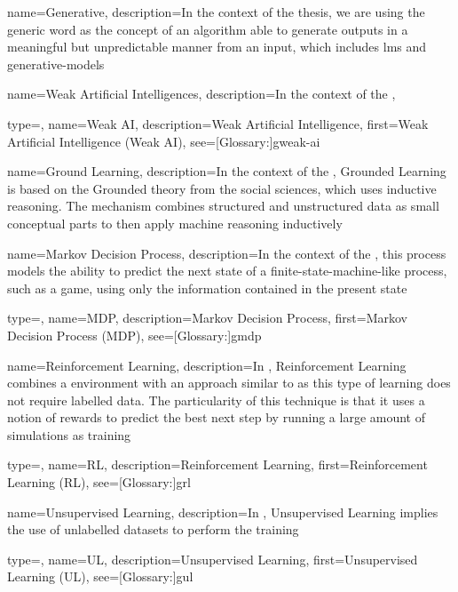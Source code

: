 {
  name={Generative},
  description={In the context of the thesis, we are using the generic word  as the concept of an algorithm able to generate outputs in a meaningful but unpredictable manner from an input, which includes \glspl{lm} and \glspl{generative-model}}
}

{
  name={Weak Artificial Intelligences},
  description={In the context of the , }
}

{
  type=\acronymtype,
  name={Weak AI},
  description={Weak Artificial Intelligence},
  first={Weak Artificial Intelligence (Weak AI)},
  see=[Glossary:]{gweak-ai}
}

{
  name={Ground Learning},
  description={In the context of the , Grounded Learning is based on the Grounded theory from the social sciences, which uses inductive reasoning. The mechanism combines structured and unstructured data as small conceptual parts to then apply machine reasoning inductively}
}


{
  name={Markov Decision Process},
  description={In the context of the , this process models the ability to predict the next state of a finite-state-machine-like process, such as a game, using only the information contained in the present state}
}

{
  type=\acronymtype,
  name={MDP},
  description={Markov Decision Process},
  first={Markov Decision Process (MDP)},
  see=[Glossary:]{gmdp}
}

{
  name={Reinforcement Learning},
  description={In , Reinforcement Learning combines a  environment with an approach similar to  as this type of learning does not require labelled data. The particularity of this technique is that it uses a notion of rewards to predict the best next step by running a large amount of simulations as training}
}

{
  type=\acronymtype,
  name={RL},
  description={Reinforcement Learning},
  first={Reinforcement Learning (RL)},
  see=[Glossary:]{grl}
}

{
  name={Unsupervised Learning},
  description={In , Unsupervised Learning implies the use of unlabelled datasets to perform the training}
}

{
  type=\acronymtype,
  name={UL},
  description={Unsupervised Learning},
  first={Unsupervised Learning (UL)},
  see=[Glossary:]{gul}
}

